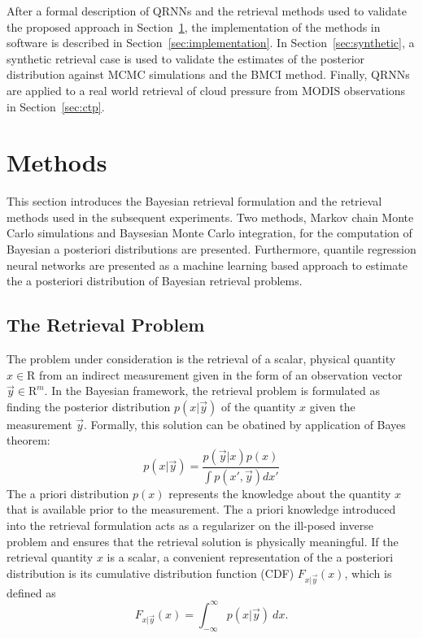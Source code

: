 \documentclass[journal abbreviation, manuscript]{copernicus}
\begin{document}
After a formal description of QRNNs and the retrieval methods used to validate
the proposed approach in Section~\ref{sec:methods}, the implementation of the
methods in software is described in Section~\ref{sec:implementation}. In
Section~\ref{sec:synthetic}, a synthetic retrieval case is used to validate the
estimates of the posterior distribution against MCMC simulations and the BMCI
method. Finally, QRNNs are applied to a real world retrieval of cloud pressure
from MODIS observations in Section~\ref{sec:ctp}.

\section{Methods}
\label{sec:methods}

This section introduces the Bayesian retrieval formulation and the retrieval methods
used in the subsequent experiments. Two methods, Markov chain Monte Carlo simulations
and Baysesian Monte Carlo integration, for the computation of Bayesian a posteriori
distributions are presented. Furthermore, quantile regression neural networks are
presented as a machine learning based approach to estimate the a posteriori distribution
of Bayesian retrieval problems.

\subsection{The Retrieval Problem}

The problem under consideration is the retrieval of a scalar, physical quantity
$x \in \mathrm{R}$ from an indirect measurement given in the form of an observation
vector $\vec{y} \in \mathrm{R}^m$. In the Bayesian framework, the retrieval problem is
formulated as finding the posterior distribution $p(x | \vec{y})$ of the
quantity $x$ given the measurement $\vec{y}$. Formally, this solution can be
obatined by application of Bayes theorem:
\begin{equation}\label{eq:bayes}
  p(x | \vec{y}) = \frac{p(\vec{y} | x)p(x)}{\int p(x', \vec{y}) dx'}
\end{equation}
The a priori distribution $p(x)$ represents the knowledge about the quantity $x$ that
is available prior to the measurement. The a priori knowledge introduced into the
retrieval formulation acts as a regularizer on the ill-posed inverse problem and
ensures that the retrieval solution is physically meaningful.
If the retrieval quantity $x$ is a scalar, a convenient representation of the a
posteriori distribution is its cumulative distribution function
(CDF) $F_{x | \vec{y}}(x)$, which is defined as
\begin{equation*}
F_{x | \vec{y}}(x) = \int_{-\infty}^{\infty} p(x | \vec{y}) \: dx.
\end{equation*}
\end{document}
